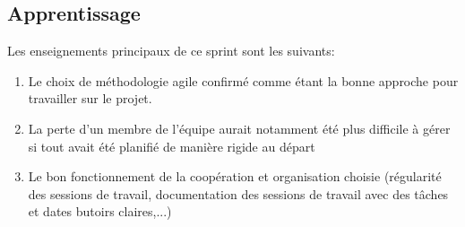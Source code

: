 \subsection{Apprentissage}

Les enseignements principaux de ce sprint sont les suivants:

\begin{enumerate}
    \item Le choix de méthodologie agile confirmé comme étant la bonne approche pour travailler sur le projet.
    \item La perte d’un membre de l'équipe aurait notamment été plus difficile à gérer si tout avait été planifié 
    de manière rigide au départ
    \item Le bon fonctionnement de la coopération et organisation choisie (régularité des sessions de travail, documentation des sessions
    de travail avec des tâches et dates butoirs claires,...)
\end{enumerate}
